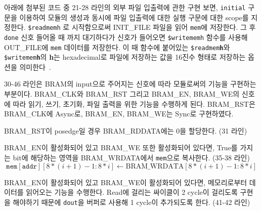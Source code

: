 \documentclass{article}
\begin{document}
\begin{itemize*}
\item 아래에 첨부된 코드 중 21-28 라인의 외부 파일 입출력에 관한 구현 보면, \texttt{initial} 구문을 이용하여 모듈의 생성과 동시에 파일 입출력에 대한 실행 구문에 대한 scope를 지정한다. 
\texttt{\$readmemh} 로 시작함으로써 INIT\_FILE 파일을 읽어 \texttt{mem}에 저장한다. 
그 후 \texttt{done} 신호 들어올 때 까지 대기하다가 신호가 들어오면 \texttt{\$writememh} 함수를 사용해 OUT\_FILE에 \texttt{mem} 데이터를 저장한다.
이 때 함수에 붙어있는 \texttt{\$readmem\textbf{h}}와 \texttt{\$writemem\textbf{h}}의 \textbf{h}는 hexadecimal로 파일에 저장하는 값을 16진수 형태로 저장하는 옵션을 의미한다~\cite{memh}. \\
\item 30-46 라인은 BRAM의 input으로 주어지는 신호에 따라 모듈로써의 기능을 구현하는 부분이다. BRAM\_CLK와 BRAM\_RST 그리고 BRAM\_EN, BRAM\_WE의 신호에 따라 읽기, 쓰기, 초기화, 파일 출력을 위한 기능을 수행하게 된다. BRAM\_RST은 BRAM\_CLK에 Async로, BRAM\_EN, BRAM\_WE는 Sync로 구현하였다.
\begin{itemize*}
\item BRAM\_RST이 posedge일 경우 BRAM\_RDDATA에는 0을 할당한다. (31 라인)
\item BRAM\_EN이 활성화되어 있고 BRAM\_WE 또한 활성화되어 있다면, True를 가지는 bit에 해당하는 영역을 BRAM\_WRDATA에서 \texttt{mem}으로 복사한다. (35-38 라인)
\begin{equation}
\texttt{mem}[ \texttt{addr} ][8*(i+1)-1:8* i ]  \leftarrow \text{BRAM\_WRDATA}[8*(i+1) -1:8* i ] 
\end{equation}
\item BRAM\_EN이 활성화되어 있고 BRAM\_WE이 활성화되어 있다면, 메모리로부터 데이터를 읽어오는 기능을 수행한다. Read에 걸리는 싸이클이 2 cycle이 걸리도록 구현을 해야하기 때문에 \texttt{dout}을 버퍼로 사용해 1 cycle이 추가되도록 한다. (41-42 라인)
\end{itemize*}
\end{itemize*}
\end{document}
